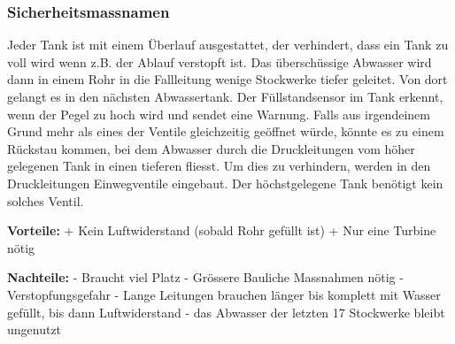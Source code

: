 \subsubsection{Sicherheitsmassnamen}
Jeder Tank ist mit einem Überlauf ausgestattet, der verhindert, dass ein Tank zu voll wird wenn z.B. der Ablauf verstopft ist. Das überschüssige Abwasser wird dann in einem Rohr in die Fallleitung wenige Stockwerke tiefer geleitet. Von dort gelangt es in den nächsten Abwassertank. Der Füllstandsensor im Tank erkennt, wenn der Pegel zu hoch wird und sendet eine Warnung.
Falls aus irgendeinem Grund mehr als eines der Ventile gleichzeitig geöffnet würde, könnte es zu einem Rückstau kommen, bei dem Abwasser durch die Druckleitungen vom höher gelegenen Tank in einen tieferen fliesst. Um dies zu verhindern, werden in den Druckleitungen Einwegventile eingebaut. Der höchstgelegene Tank benötigt kein solches Ventil. 


\textbf{Vorteile:} 									\newline
+	Kein Luftwiderstand (sobald Rohr gefüllt ist)	\newline
+	Nur eine Turbine nötig							\newline

\textbf{Nachteile:}									\newline
-	Braucht viel Platz 								\newline
-	Grössere Bauliche Massnahmen nötig				\newline
-	Verstopfungsgefahr 								\newline
-	Lange Leitungen brauchen länger bis komplett mit Wasser gefüllt, bis dann Luftwiderstand
-	das Abwasser der letzten 17 Stockwerke bleibt ungenutzt